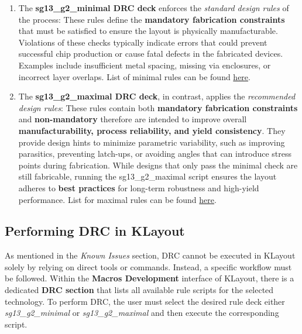 \documentclass[
  11pt,
  a4paper,
  oneside]{scrbook}
\begin{document}
\begin{enumerate}
\def\labelenumi{\arabic{enumi}.}
\item
  The \textbf{sg13\_g2\_minimal DRC deck} enforces the \emph{standard
  design rules} of the process: These rules define the \textbf{mandatory
  fabrication constraints} that must be satisfied to ensure the layout
  is physically manufacturable. Violations of these checks typically
  indicate errors that could prevent successful chip production or cause
  fatal defects in the fabricated devices. Examples include insufficient
  metal spacing, missing via enclosures, or incorrect layer overlaps.
  List of minimal rules can be found
  \href{https://github.com/IHP-GmbH/IHP-Open-PDK/blob/main/ihp-sg13g2/libs.tech/klayout/tech/drc/README_minimal.md}{here}.
\item
  The \textbf{sg13\_g2\_maximal DRC deck}, in contrast, applies the
  \emph{recommended design rules}: These rules contain both
  \textbf{mandatory fabrication constraints} and \textbf{non-mandatory}
  therefore are intended to improve overall \textbf{manufacturability,
  process reliability, and yield consistency}. They provide design hints
  to minimize parametric variability, such as improving parasitics,
  preventing latch-ups, or avoiding angles that can introduce stress
  points during fabrication. While designs that only pass the minimal
  check are still fabricable, running the sg13\_g2\_maximal script
  ensures the layout adheres to \textbf{best practices} for long-term
  robustness and high-yield performance. List for maximal rules can be
  found
  \href{https://github.com/IHP-GmbH/IHP-Open-PDK/blob/main/ihp-sg13g2/libs.tech/klayout/tech/drc/README_maximal.md}{here}.
\end{enumerate}

\subsection{Performing DRC in KLayout}\label{performing-drc-in-klayout}

As mentioned in the \emph{Known Issues} section, DRC cannot be executed
in KLayout solely by relying on direct tools or commands. Instead, a
specific workflow must be followed. Within the \textbf{Macros
Development} interface of KLayout, there is a dedicated \textbf{DRC
section} that lists all available rule scripts for the selected
technology. To perform DRC, the user must select the desired rule deck
either \emph{sg13\_g2\_minimal} or \emph{sg13\_g2\_maximal} and then
execute the corresponding script.
\end{document}
